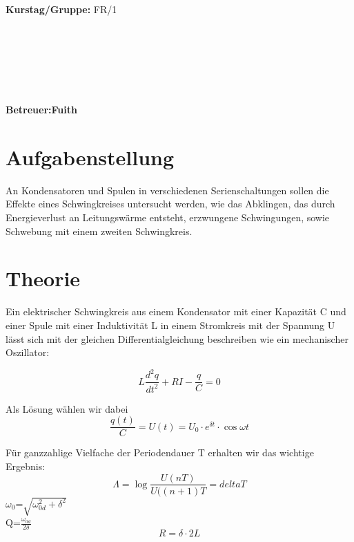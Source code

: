 \documentclass{article}
\begin{document}
\begin{verbatim}


\end{verbatim}
			\begin{flushleft}
			\textbf{\Large{Kurstag/Gruppe:}} \Large{FR/1}
			\end{flushleft}

\begin{verbatim}






\end{verbatim}
			\begin{flushleft}
			\LARGE{\textbf{Betreuer:\Large{Fuith}}}		
			\end{flushleft}
			
\section{Aufgabenstellung}
An Kondensatoren und Spulen in verschiedenen Serienschaltungen sollen die Effekte eines Schwingkreises untersucht werden, wie das Abklingen, das durch Energieverlust an Leitungswärme entsteht, erzwungene Schwingungen, sowie Schwebung mit einem zweiten Schwingkreis.
\section{Theorie}
Ein elektrischer Schwingkreis aus einem Kondensator mit einer Kapazität C und einer Spule mit einer Induktivität L in einem Stromkreis mit der Spannung U lässt sich mit der gleichen Differentialgleichung beschreiben wie ein mechanischer Oszillator:

\begin{equation}
\label{HarmOsz}
L\frac{d^2q}{dt^2}+RI-\frac{q}{C}=0
\end{equation}

Als Lösung wählen wir dabei 
\begin{equation}
\label{Schwingungsgleichung}
\frac{q(t)}{C}=U(t)=U_{0}\cdot e^{\delta t}\cdot \cos{\omega t}
\end{equation}

Für ganzzahlige Vielfache der Periodendauer T erhalten wir das wichtige Ergebnis:
\begin{equation}
\label{LogarithmDekr}
\Lambda=\log{\frac{U(nT)}{U((n+1)T}}=delta T
\end{equation}
$\omega_{0}$=$\sqrt{\omega_{0d}^2+\delta^2}$\\
Q=$\frac{\omega_{0d}}{2\delta}$ \\
$$R=\delta \cdot 2L$$ \\
\end{document}
